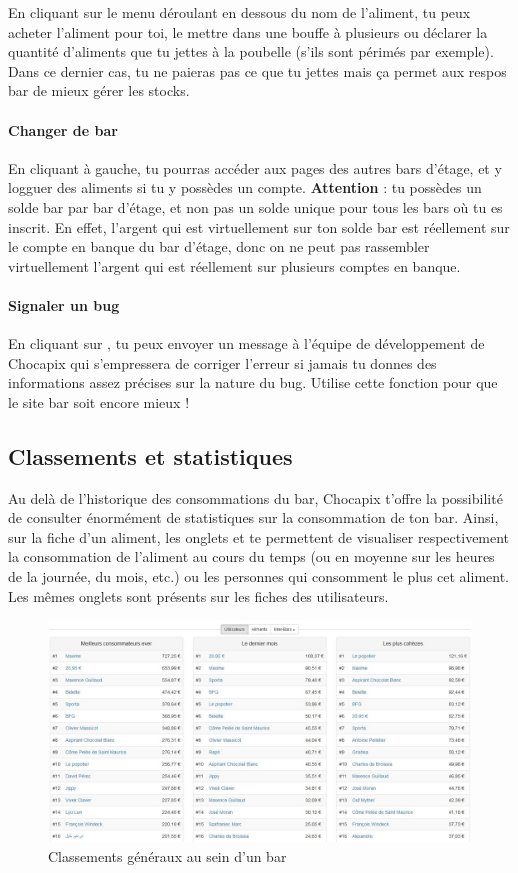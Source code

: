 \documentclass[12pt,french]{article}
\begin{document}
En cliquant sur le menu déroulant en dessous du nom de l'aliment, tu peux acheter l'aliment pour toi, le mettre dans une bouffe à plusieurs ou déclarer la quantité d'aliments que tu jettes à la poubelle (s'ils sont périmés par exemple). Dans ce dernier cas, tu ne paieras pas ce que tu jettes mais ça permet aux respos bar de mieux gérer les stocks.

\paragraph{Changer de bar} En cliquant  à gauche, tu pourras accéder aux pages des autres bars d'étage, et y logguer des aliments si tu y possèdes un compte. \textbf{Attention} : tu possèdes un solde bar par bar d'étage, et non pas un solde unique pour tous les bars où tu es inscrit. En effet, l'argent qui est virtuellement sur ton solde bar est réellement sur le compte en banque du bar d'étage, donc on ne peut pas rassembler virtuellement l'argent qui est réellement sur plusieurs comptes en banque.

\paragraph{Signaler un bug} En cliquant sur , tu peux envoyer un message à l'équipe de développement de Chocapix qui s'empressera de corriger l'erreur si jamais tu donnes des informations assez précises sur la nature du bug. Utilise cette fonction pour que le site bar soit encore mieux !

\subsection{Classements et statistiques}

Au delà de l'historique des consommations du bar, Chocapix t'offre la possibilité de consulter énormément de statistiques sur la consommation de ton bar. Ainsi, sur la fiche d'un aliment, les onglets  et  te permettent de visualiser respectivement la consommation de l'aliment au cours du temps (ou en moyenne sur les heures de la journée, du mois, etc.) ou les personnes qui consomment le plus cet aliment. Les mêmes onglets sont présents sur les fiches des utilisateurs.

\begin{figure}[h]
	\includegraphics[width=16cm]{images/classements}
	\caption{Classements généraux au sein d'un bar}
\end{figure}
\end{document}
